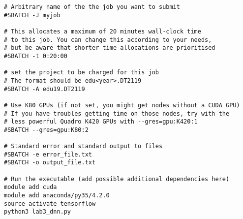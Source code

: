 \documentclass{nada-ten}
\begin{document}
\begin{enumerate}
\begin{verbatim}
# Arbitrary name of the the job you want to submit
#SBATCH -J myjob

# This allocates a maximum of 20 minutes wall-clock time
# to this job. You can change this according to your needs,
# but be aware that shorter time allocations are prioritised
#SBATCH -t 0:20:00

# set the project to be charged for this job
# The format should be edu<year>.DT2119
#SBATCH -A edu19.DT2119

# Use K80 GPUs (if not set, you might get nodes without a CUDA GPU)
# If you have troubles getting time on those nodes, try with the
# less powerful Quadro K420 GPUs with --gres=gpu:K420:1
#SBATCH --gres=gpu:K80:2

# Standard error and standard output to files
#SBATCH -e error_file.txt
#SBATCH -o output_file.txt

# Run the executable (add possible additional dependencies here)
module add cuda
module add anaconda/py35/4.2.0
source activate tensorflow
python3 lab3_dnn.py
\end{verbatim}


\end{enumerate}
\end{document}
